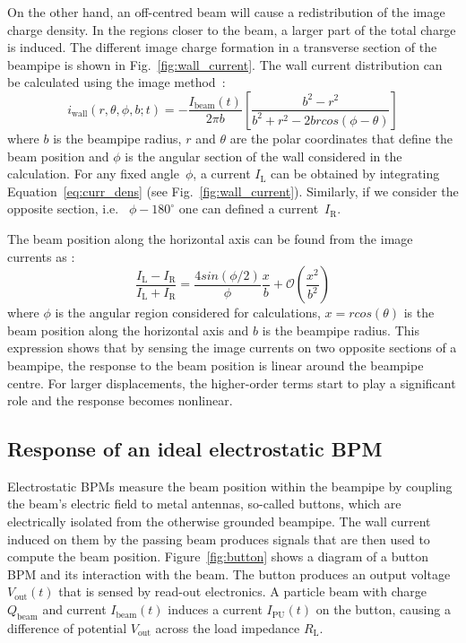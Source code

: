 On the other hand, an off-centred beam will cause a redistribution of the image charge density. In the regions closer to the beam, a larger part of the total charge is induced. The different image charge formation in a transverse section of the beampipe is shown in Fig.~\ref{fig:wall_current}. The wall current distribution can be calculated using the image method~\cite{scharfer:bpm}:
\begin{equation}
i_\text{wall} (r, \theta, \phi, b; t) = -\frac{I_\text{beam}(t)}{2\pi b} \left[ \frac{b^2 - r^2}{b^2 + r^2 - 2br cos\left( \phi - \theta \right)}   \right] \label{eq:curr_dens}
\end{equation}
where $b$ is the beampipe radius, $r$ and $\theta$ are the polar coordinates that define the beam position and $\phi$ is the angular section of the wall considered in the calculation. For any fixed angle~$\phi$, a current $I_\text{L}$ can be obtained by integrating Equation~\ref{eq:curr_dens} (see Fig.~\ref{fig:wall_current}). Similarly, if we consider the opposite section, i.e. ~$\phi-180^\circ$ one can defined a current~$I_\text{R}$.

The beam position along the horizontal axis can be found from the image currents as \cite{scharfer:bpm}:
\begin{equation}
\frac{I_\text{L} - I_\text{R}}{I_\text{L} + I_\text{R}} = \frac{4 sin\left(\phi/2\right)}{\phi}  \frac{x}{b} + \mathcal{O}\left( \frac{x^2}{b^2} \right)
\end{equation}
where $\phi$ is the angular region considered for calculations, $x = r cos(\theta)$ is the beam position along the horizontal axis and $b$ is the beampipe radius. This expression shows that by sensing the image currents on two opposite sections of a beampipe, the response to the beam position is linear around the beampipe centre. For larger displacements, the higher-order terms start to play a significant role and the response becomes nonlinear. 


\subsection[Response of an ideal electrostatic BPM]{Response of an ideal electrostatic BPM}

Electrostatic BPMs measure the beam position within the beampipe by coupling the beam's electric field to metal antennas, so-called buttons, which are electrically isolated from the otherwise grounded beampipe. The wall current induced on them by the passing beam produces signals that are then used to compute the beam position. Figure~\ref{fig:button} shows a diagram of a button BPM and its interaction with the beam. The button produces an output voltage $V_\text{out}(t)$ that is sensed by read-out electronics. A particle beam with charge $Q_\text{beam}$ and current $I_\text{beam}(t)$ induces a current $I_\text{PU}(t)$ on the button, causing a difference of potential $V_\text{out}$ across the load impedance $R_\text{L}$.

